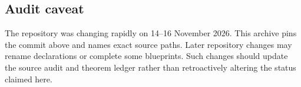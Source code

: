\subsection{Audit caveat}

The repository was changing rapidly on 14--16 November 2026.  This archive pins the commit above and names exact source paths.  Later repository changes may rename declarations or complete some blueprints.  Such changes should update the source audit and theorem ledger rather than retroactively altering the status claimed here.
